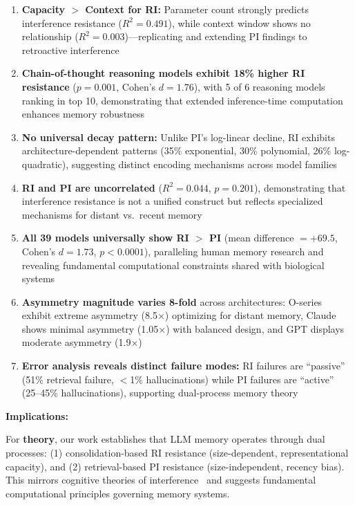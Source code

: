 \documentclass{article}
\begin{document}
\begin{enumerate}
    \item \textbf{Capacity $>$ Context for RI:} Parameter count strongly predicts interference resistance ($R^2 = 0.491$), while context window shows no relationship ($R^2 = 0.003$)---replicating and extending PI findings to retroactive interference

    \item \textbf{Chain-of-thought reasoning models exhibit 18\% higher RI resistance} ($p = 0.001$, Cohen's $d = 1.76$), with 5 of 6 reasoning models ranking in top 10, demonstrating that extended inference-time computation enhances memory robustness

    \item \textbf{No universal decay pattern:} Unlike PI's log-linear decline, RI exhibits architecture-dependent patterns (35\% exponential, 30\% polynomial, 26\% log-quadratic), suggesting distinct encoding mechanisms across model families

    \item \textbf{RI and PI are uncorrelated} ($R^2 = 0.044$, $p = 0.201$), demonstrating that interference resistance is not a unified construct but reflects specialized mechanisms for distant vs.\ recent memory

    \item \textbf{All 39 models universally show RI $>$ PI} (mean difference $= +69.5$, Cohen's $d = 1.73$, $p < 0.0001$), paralleling human memory research and revealing fundamental computational constraints shared with biological systems

    \item \textbf{Asymmetry magnitude varies 8-fold} across architectures: O-series exhibit extreme asymmetry (8.5$\times$) optimizing for distant memory, Claude shows minimal asymmetry (1.05$\times$) with balanced design, and GPT displays moderate asymmetry (1.9$\times$)

    \item \textbf{Error analysis reveals distinct failure modes:} RI failures are ``passive'' (51\% retrieval failure, $<$1\% hallucinations) while PI failures are ``active'' (25--45\% hallucinations), supporting dual-process memory theory
\end{enumerate}

\textbf{Implications:}

For \textbf{theory}, our work establishes that LLM memory operates through dual processes: (1) consolidation-based RI resistance (size-dependent, representational capacity), and (2) retrieval-based PI resistance (size-independent, recency bias). This mirrors cognitive theories of interference~\citep{underwood1957interference, wixted2004consolidation} and suggests fundamental computational principles governing memory systems.
\end{document}
